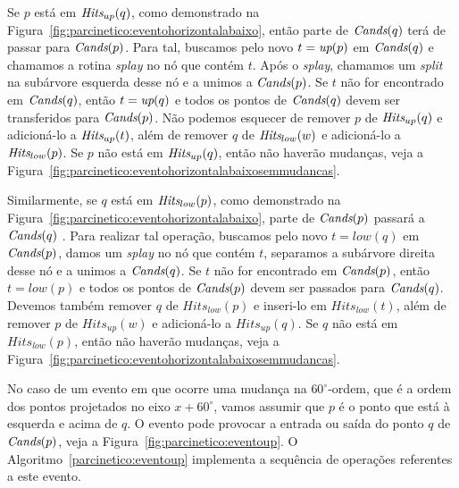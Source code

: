 

Se $p$ está em $\textit{Hits}_{up}(q)$, como demonstrado na
Figura~\ref{fig:parcinetico:eventohorizontalabaixo}, então parte de $\textit{Cands}(q)$ terá de passar
para $\textit{Cands}(p)$.
Para tal, buscamos pelo novo $t = \textit{up}(p)$ em $\textit{Cands}(q)$ e chamamos a rotina \textit{splay} no
nó que contém $t$.
Após o \textit{splay}, chamamos um \textit{split} na subárvore esquerda desse nó e a unimos a
$\textit{Cands}(p)$.
Se $t$ não for encontrado em $\textit{Cands}(q)$, então $t = \textit{up}(q)$ e todos os pontos de $\textit{Cands}(q)$
devem ser transferidos para $\textit{Cands}(p)$.
Não podemos esquecer de remover $p$ de $\textit{Hits}_{up}(q)$ e adicioná-lo a $\textit{Hits}_{up}(t)$, além de
remover $q$ de $\textit{Hits}_{low}(w)$ e adicioná-lo a $\textit{Hits}_{low}(p)$.
Se $p$ não está em $\textit{Hits}_{up}(q)$, então não haverão mudanças, veja a
Figura~\ref{fig:parcinetico:eventohorizontalabaixosemmudancas}.



Similarmente, se $q$ está em $\textit{Hits}_{low}(p)$, como demonstrado na
Figura~\ref{fig:parcinetico:eventohorizontalabaixo}, parte de $\textit{Cands}(p)$ passará a $\textit{Cands}(q)$
.
Para realizar tal operação, buscamos pelo novo $t = low(q)$ em $\textit{Cands}(p)$, damos um \textit{splay}
no nó que contém $t$, separamos a subárvore direita desse nó e a unimos a $\textit{Cands}(q)$.
Se $t$ não for encontrado em $\textit{Cands}(p)$, então $t = low(p)$ e todos os pontos de $\textit{Cands}(p)$ devem
ser passados para $\textit{Cands}(q)$.
Devemos também remover $q$ de $Hits_{low}(p)$ e inseri-lo em $Hits_{low}(t)$, além de remover $p$
de $Hits_{up}(w)$ e adicioná-lo a $Hits_{up}(q)$.
Se $q$ não está em $Hits_{low}(p)$, então não haverão mudanças, veja a
Figura~\ref{fig:parcinetico:eventohorizontalabaixosemmudancas}.



No caso de um evento em que ocorre uma mudança na $60^\circ$-ordem, que é a ordem dos pontos
projetados no eixo $x + 60^\circ$, vamos assumir que $p$ é o ponto que está à esquerda e acima de $q$.
O evento pode provocar a entrada ou saída do ponto $q$ de $\textit{Cands}(p)$, veja a
Figura~\ref{fig:parcinetico:eventoup}.
O Algoritmo~\ref{parcinetico:eventoup} implementa a sequência de operações referentes a este
evento.


